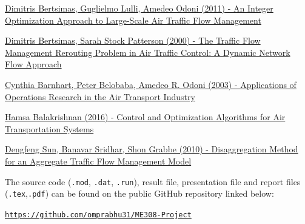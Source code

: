 \documentclass[conference]{IEEEtran}
\begin{document}
\begin{enumerate}[label={[\arabic*]}]
    \item \href{https://pubsonline.informs.org/doi/epdf/10.1287/opre.1100.0899}{Dimitris Bertsimas, Guglielmo Lulli, Amedeo Odoni (2011) - An Integer Optimization Approach to Large-Scale Air Traffic Flow Management}
    \item \href{https://pubsonline.informs.org/doi/epdf/10.1287/trsc.34.3.239.12300}{Dimitris Bertsimas, Sarah Stock Patterson (2000) - The Traffic Flow Management Rerouting Problem in Air Traffic Control: A Dynamic Network Flow Approach}
    \item \href{https://pubsonline.informs.org/doi/pdf/10.1287/trsc.37.4.368.23276}{Cynthia Barnhart, Peter Belobaba, Amedeo R. Odoni (2003) - Applications of Operations Research in the Air Transport Industry}
    \item \href{https://web.mit.edu/hamsa/www/pubs/Balakrishnan_ARC2016.pdf}{Hamsa Balakrishnan (2016) - Control and Optimization Algorithms for Air Transportation Systems}
    \item \href{https://web.ics.purdue.edu/~dsun/pubs/jogcd10.pdf}{Dengfeng Sun, Banavar Sridhar, Shon Grabbe (2010) - Disaggregation Method for an Aggregate Traffic Flow Management Model}
\end{enumerate}
\vspace{2mm}

The source code (\texttt{.mod}, \texttt{.dat}, \texttt{.run}), result file, presentation file and report files (\texttt{.tex},\texttt{.pdf}) can be found on the public GitHub repository linked below:
\vspace{2mm}

\href{https://github.com/omprabhu31/ME308-Project}{\texttt{https://github.com/omprabhu31/ME308-Project}}
\end{document}
